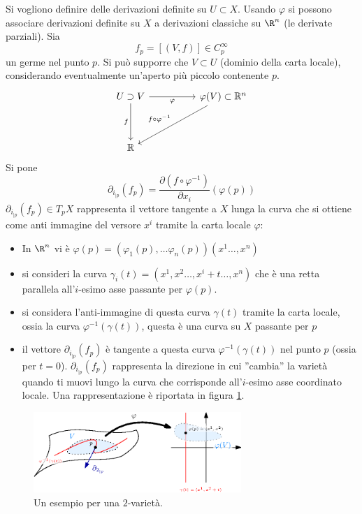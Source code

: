 \documentclass[10pt, letterpaper]{report}
\begin{document}
\noindent Si vogliono definire delle derivazioni definite su $U\subset X$. Usando $\varphi$ si possono associare derivazioni definite su $X$ a derivazioni classiche su $\R^n$ (le derivate parziali). Sia \begin{equation}
    f_p=[(V,f)]\in C_p^\infty
\end{equation}
un germe nel punto $p$. Si può supporre che $V\subset U$ (dominio della carta locale), considerando eventualmente un'aperto più piccolo contenente $p$.
\[
\begin{tikzcd}[column sep=huge, row sep=huge]
U \supset V \arrow[r, "\varphi"'] \arrow[d, "f"'] & \varphi(V) \subset \mathbb{R}^n \arrow[dl, "f \circ \varphi^{-1}"'] \\
\mathbb{R}
\end{tikzcd}
\]
Si pone\begin{equation}\label{eq:derivata}
    \partial_{i_{|p}}(f_p)=\frac{\partial (f\circ\varphi^{-1})}{\partial x_i}(\varphi(p))
\end{equation}
$ \partial_{i_{|p}}(f_p)\in T_pX$ rappresenta il vettore tangente a $X$ lunga la curva che si ottiene come anti immagine del versore $x^i$ tramite la carta locale $\varphi$:\begin{itemize}
    \item In $\R^n$ vi è $\varphi(p)=(\varphi_1(p),\dots\varphi_n(p))(x^1\dots,x^n)$
    \item si consideri la curva $\gamma_i(t)=(x^1,x^2\dots,x^i+t\dots,x^n)$ che è una retta parallela all'$i$-esimo asse passante per $\varphi(p)$.
    \item si considera l'anti-immagine di questa curva $\gamma(t)$ tramite la carta locale, ossia la curva $\varphi^{-1}(\gamma(t))$, questa è una curva su $X$ passante per $p$
    \item il vettore $\partial_{i_{|p}}(f_p)$ è tangente a questa curva $\varphi^{-1}(\gamma(t))$ nel punto $p$ (ossia per $t=0$).  $\partial_{i_{|p}}(f_p)$  rappresenta la direzione in cui ''cambia'' la varietà quando ti muovi lungo la curva che corrisponde all'$i$-esimo asse coordinato locale. Una rappresentazione è riportata in figura \ref{img:derivata}.
\end{itemize}

\begin{figure}[h!]
    \center
    \includegraphics[width=0.7\textwidth ]{images/derivata.eps}
    \caption{Un esempio per una $2$-varietà.}
    \label{img:derivata}
\end{figure}
\end{document}
